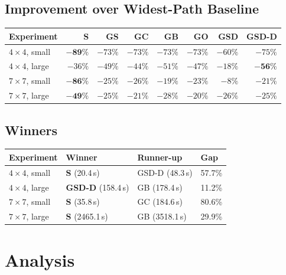 \documentclass[11pt]{article}
\begin{document}
\subsection{Improvement over Widest-Path Baseline}

\begin{table}[h]
\centering
\begin{tabular}{lrrrrrrr}
\toprule
\textbf{Experiment}
  & \textbf{S} & \textbf{GS} & \textbf{GC} & \textbf{GB} & \textbf{GO} & \textbf{GSD} & \textbf{GSD-D} \\
\midrule
$4\times4$, small & $\mathbf{-89\%}$ & $-73\%$ & $-73\%$ & $-73\%$ & $-73\%$ & $-60\%$ & $-75\%$ \\
$4\times4$, large & $-36\%$ & $-49\%$ & $-44\%$ & $-51\%$ & $-47\%$ & $-18\%$ & $\mathbf{-56\%}$ \\
$7\times7$, small & $\mathbf{-86\%}$ & $-25\%$ & $-26\%$ & $-19\%$ & $-23\%$ & $-8\%$  & $-21\%$ \\
$7\times7$, large & $\mathbf{-49\%}$ & $-25\%$ & $-21\%$ & $-28\%$ & $-20\%$ & $-26\%$ & $-25\%$ \\
\bottomrule
\end{tabular}
\end{table}

\subsection{Winners}

\begin{table}[h]
\centering
\begin{tabular}{llll}
\toprule
\textbf{Experiment} & \textbf{Winner} & \textbf{Runner-up} & \textbf{Gap} \\
\midrule
$4\times4$, small & \textbf{S} (20.4\,s)     & GSD-D (48.3\,s)  & 57.7\% \\
$4\times4$, large & \textbf{GSD-D} (158.4\,s) & GB (178.4\,s)    & 11.2\% \\
$7\times7$, small & \textbf{S} (35.8\,s)      & GC (184.6\,s)    & 80.6\% \\
$7\times7$, large & \textbf{S} (2465.1\,s)    & GB (3518.1\,s)   & 29.9\% \\
\bottomrule
\end{tabular}
\end{table}

\section{Analysis}
\end{document}
